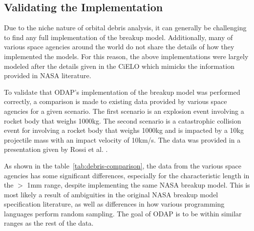 \documentclass[a4paper, 12pt]{article}
\begin{document}
\subsection{Validating the Implementation}
Due to the niche nature of orbital debris analysis, it can generally be challenging to find any full implementation of the breakup model. Additionally, many of various space agencies around the world do not share the details of how they implemented the models. For this reason, the above implementations were largely modeled after the details given in the CiELO \cite{letizia_space_2016} which mimicks the information provided in NASA literature.

To validate that ODAP's implementation of the breakup model was performed correctly, a comparison is made to existing data provided by various space agencies for a given scenario. The first scenario is an explosion event involving a rocket body that weighs 1000kg. The second scenario is a catastrophic collision event for involving a rocket body that weighs 1000kg and is impacted by a 10kg  projectile mass with an impact velocity of 10km/s. The data was provided in a presentation given by Rossi et al. \citep{rossi_nasa_nodate}.

As shown in the table~\ref{tab:debris-comparison}, the data from the various space agencies has some significant differences, especially for the characteristic length in the $>$ 1mm range, despite implementing the same NASA breakup model. This is most likely a result of ambiguities in the original NASA breakup model specification literature, as well as differences in how various programming languages perform random sampling. The goal of ODAP is to be within similar ranges as the rest of the data.
 
\end{document}

